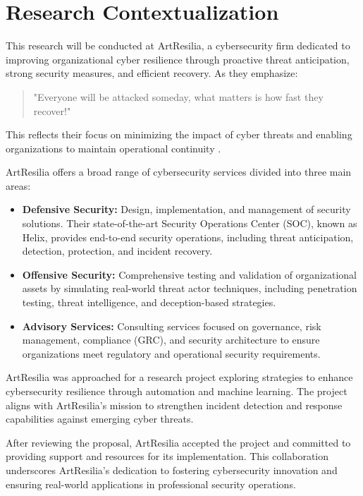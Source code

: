 \section{Research Contextualization}

This research will be conducted at ArtResilia, a cybersecurity firm dedicated to improving organizational cyber resilience through proactive threat anticipation, strong security measures, and efficient recovery.
As they emphasize: 

\begin{quote}
    "Everyone will be attacked someday, what matters is how fast they recover!"  
\end{quote}

This reflects their focus on minimizing the impact of cyber threats and enabling organizations to maintain operational continuity \parencite{artresilia2024}.

ArtResilia offers a broad range of cybersecurity services divided into three main areas:
\begin{itemize}
    \item \textbf{Defensive Security:} Design, implementation, and management of security solutions. Their state-of-the-art Security Operations Center (SOC), known as Helix, provides end-to-end security operations, including threat anticipation, detection, protection, and incident recovery.
    \item \textbf{Offensive Security:} Comprehensive testing and validation of organizational assets by simulating real-world threat actor techniques, including penetration testing, threat intelligence, and deception-based strategies.
    \item \textbf{Advisory Services:} Consulting services focused on governance, risk management, compliance (GRC), and security architecture to ensure organizations meet regulatory and operational security requirements.
\end{itemize}

ArtResilia was approached for a research project exploring strategies to enhance cybersecurity resilience through automation and machine learning. The project aligns with ArtResilia's mission to strengthen incident detection and response capabilities against emerging cyber threats.

After reviewing the proposal, ArtResilia accepted the project and committed to providing support and resources for its implementation. This collaboration underscores ArtResilia's dedication to fostering cybersecurity innovation and ensuring real-world applications in professional security operations.

